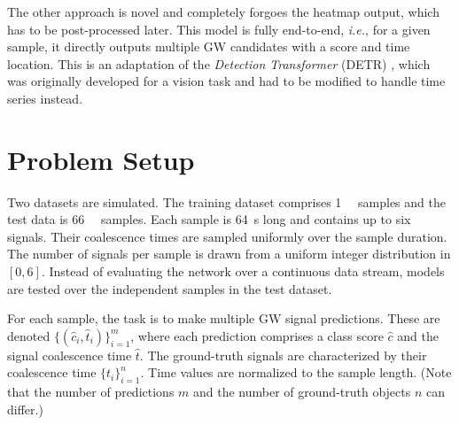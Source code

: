 The other approach is novel and completely forgoes the heatmap output, which has to be post-processed later. This model is fully end-to-end, \emph{i.e.}, for a given sample, it directly outputs multiple GW candidates with a score and time location. This is an adaptation of the \emph{Detection Transformer} (DETR) \cite{10.1007/978-3-030-58452-8_13}, which was originally developed for a vision task and had to be modified to handle time series instead.





\section{Problem Setup}


Two datasets are simulated. The training dataset comprises \SI{1}{\mega\nothing} samples and the test data is \SI{66}{\kilo\nothing} samples. Each sample is \SI{64}{\second} long and contains up to six signals. Their coalescence times are sampled uniformly over the sample duration. The number of signals per sample is drawn from a uniform integer distribution in $[0,6]$. Instead of evaluating the network over a continuous data stream, models are tested over the independent samples in the test dataset. 


For each sample, the task is to make multiple GW signal predictions. These are denoted $\{(\hat{c}_i,\hat{t}_i)\}_{i=1}^{m}$, where each prediction comprises a class score $\hat{c}$ and the signal coalescence time $\hat{t}$. The ground-truth signals are characterized by their coalescence time $\{t_i\}_{i=1}^{n}$. Time values are normalized to the sample length. (Note that the number of predictions $m$ and the number of ground-truth objects $n$ can differ.) 

